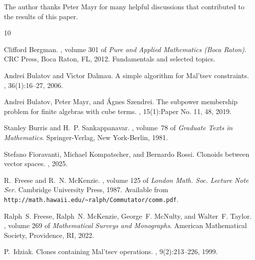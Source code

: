 \documentclass[12pt]{amsart}
\numberwithin{equation}{section}
\theoremstyle{plain}
\theoremstyle{definition}
\begin{document}
 The author thanks Peter Mayr for many helpful discussions that contributed to the results of this paper.





% 
%
 

\begin{thebibliography}{10}

Clifford Bergman.
, volume 301 of {\em Pure and Applied
  Mathematics (Boca Raton)}.
\newblock CRC Press, Boca Raton, FL, 2012.
\newblock Fundamentals and selected topics.

Andrei Bulatov and V\'{\i}ctor Dalmau.
\newblock A simple algorithm for {M}al'tsev constraints.
, 36(1):16--27, 2006.

Andrei Bulatov, Peter Mayr, and \'{A}gnes Szendrei.
\newblock The subpower membership problem for finite algebras with cube terms.
, 15(1):Paper No. 11, 48, 2019.

Stanley Burris and H.~P. Sankappanavar.
, volume~78 of {\em Graduate Texts
  in Mathematics}.
\newblock Springer-Verlag, New York-Berlin, 1981.

Stefano Fioravanti, Michael Kompatscher, and Bernardo Rossi.
\newblock Clonoids between vector spaces.
, 2025.

R.~Freese and R.~N. McKenzie.
, volume 125
  of {\em London Math. Soc. Lecture Note Ser.}
\newblock Cambridge University Press, 1987.
\newblock Available from
  \verb+http://math.hawaii.edu/~ralph/Commutator/comm.pdf+.

Ralph~S. Freese, Ralph~N. McKenzie, George~F. McNulty, and Walter~F. Taylor.
, volume 269 of {\em
  Mathematical Surveys and Monographs}.
\newblock American Mathematical Society, Providence, RI, 2022.

P.~Idziak.
\newblock Clones containing {M}al'tsev operations.
,
  9(2):213--226, 1999.


\end{thebibliography}
\end{document}
